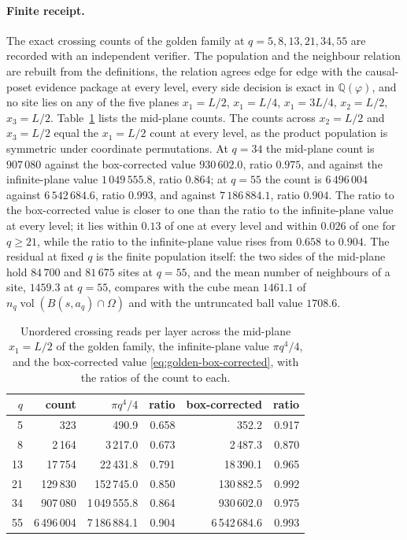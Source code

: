 \paragraph{Finite receipt.}
The exact crossing counts of the golden family at $q=5,8,13,21,34,55$ are
recorded with an independent verifier. The population and the neighbour
relation are rebuilt from the definitions, the relation agrees edge for
edge with the causal-poset evidence package at every level, every side
decision is exact in $\mathbb Q(\varphi)$, and no site lies on any of the
five planes $x_1=L/2$, $x_1=L/4$, $x_1=3L/4$, $x_2=L/2$, $x_3=L/2$.
Table~\ref{tab:crossing-receipt} lists the mid-plane counts. The counts
across $x_2=L/2$ and $x_3=L/2$ equal the $x_1=L/2$ count at every level,
as the product population is symmetric under coordinate permutations. At
$q=34$ the mid-plane count is $907\,080$ against the box-corrected value
$930\,602.0$, ratio $0.975$, and against the infinite-plane value
$1\,049\,555.8$, ratio $0.864$; at $q=55$ the count is $6\,496\,004$
against $6\,542\,684.6$, ratio $0.993$, and against $7\,186\,884.1$, ratio
$0.904$. The ratio to the box-corrected value is closer to one than the
ratio to the infinite-plane value at every level; it lies within $0.13$ of
one at every level and within $0.026$ of one for $q\geq21$, while the
ratio to the infinite-plane value rises from $0.658$ to $0.904$. The
residual at fixed $q$ is the finite population itself: the two sides of
the mid-plane hold $84\,700$ and $81\,675$ sites at $q=55$, and the mean
number of neighbours of a site, $1459.3$ at $q=55$, compares with the
cube mean $1461.1$ of $n_q\operatorname{vol}(B(s,a_q)\cap\Omega)$ and with
the untruncated ball value $1708.6$.

\begin{table}[ht]
\centering
\begin{tabular}{rrrrrr}
\toprule
$q$ & count & $\pi q^4/4$ & ratio & box-corrected & ratio \\
\midrule
5 & 323 & 490.9 & 0.658 & 352.2 & 0.917 \\
8 & 2\,164 & 3\,217.0 & 0.673 & 2\,487.3 & 0.870 \\
13 & 17\,754 & 22\,431.8 & 0.791 & 18\,390.1 & 0.965 \\
21 & 129\,830 & 152\,745.0 & 0.850 & 130\,882.5 & 0.992 \\
34 & 907\,080 & 1\,049\,555.8 & 0.864 & 930\,602.0 & 0.975 \\
55 & 6\,496\,004 & 7\,186\,884.1 & 0.904 & 6\,542\,684.6 & 0.993 \\
\bottomrule
\end{tabular}
\caption{Unordered crossing reads per layer across the mid-plane
$x_1=L/2$ of the golden family, the infinite-plane value $\pi q^4/4$, and
the box-corrected value \eqref{eq:golden-box-corrected}, with the ratios
of the count to each.}
\label{tab:crossing-receipt}
\end{table}

